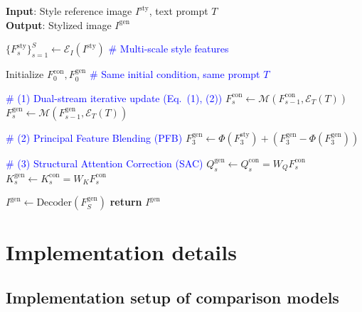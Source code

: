 \documentclass[10pt,twocolumn,letterpaper]{article}
\begin{document}
\begin{algorithm}[t]
	\caption{Dual-path style-personalized image generation}
	\label{alg:ours}
	\textbf{Input}: Style reference image $I^{\mathrm{sty}}$, text prompt $T$ \\ 
	\textbf{Output}: Stylized image $I^{\mathrm{gen}}$
	
	\begin{algorithmic}[1]
		
		\STATE $\{F_s^{\mathrm{sty}}\}_{s=1}^{S} \leftarrow \mathcal{E}_I(I^{\mathrm{sty}})$
		\textcolor{blue}{\small \# Multi-scale style features}
		
		\STATE Initialize $F_0^{\mathrm{con}}, F_0^{\mathrm{gen}}$  
		\textcolor{blue}{\small \# Same initial condition, same prompt $T$}
		
		
		\STATE \textcolor{blue}{\small\# (1) Dual-stream iterative update (Eq.~(1), (2))}
		\STATE $F_s^{\mathrm{con}} \leftarrow \mathcal{M}(F_{s-1}^{\mathrm{con}}, \mathcal{E}_T(T))$
		\STATE $F_s^{\mathrm{gen}} \leftarrow \mathcal{M}(F_{s-1}^{\mathrm{gen}}, \mathcal{E}_T(T))$
		
		\STATE \textcolor{blue}{\small\# (2) Principal Feature Blending (PFB)}
		\STATE $F_3^{\mathrm{gen}} \leftarrow 
		\Phi(F_3^{\mathrm{sty}}) + (F_3^{\mathrm{gen}} - \Phi(F_3^{\mathrm{gen}}))$
		\ENDIF
		
		\STATE \textcolor{blue}{\small\# (3) Structural Attention Correction (SAC)}
		\STATE $Q_s^{\mathrm{gen}} \leftarrow Q_s^{\mathrm{con}} = W_Q F_s^{\mathrm{con}}$
		\STATE $K_s^{\mathrm{gen}} \leftarrow K_s^{\mathrm{con}} = W_K F_s^{\mathrm{con}}$
		\ENDIF
		
		\ENDFOR
		
		\STATE $I^{\mathrm{gen}} \leftarrow \text{Decoder}(F_S^{\mathrm{gen}})$
		\STATE \textbf{return} $I^{\mathrm{gen}}$
		
	\end{algorithmic}
\end{algorithm}

\section{Implementation details}

\subsection{Implementation setup of comparison models}
\end{document}
